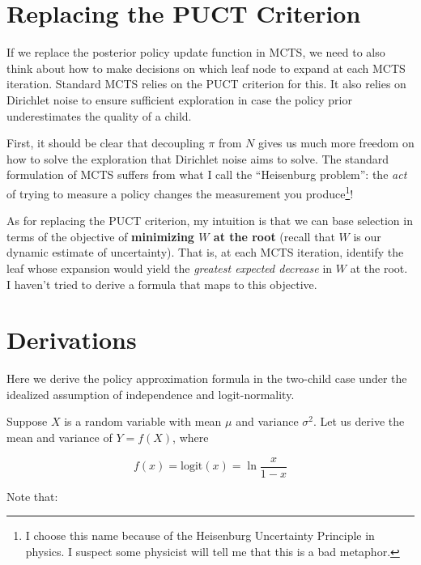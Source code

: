 \documentclass[tikz]{article}
\newcommand{\logit}{\mathrm{logit}}
\begin{document}
\section{Replacing the PUCT Criterion}

If we replace the posterior policy update function in MCTS, we need to also think about how to make decisions on which leaf node to expand
at each MCTS iteration. Standard MCTS relies on the PUCT criterion for this. It also relies on Dirichlet noise to ensure sufficient
exploration in case the policy prior underestimates the quality of a child. \newline

First, it should be clear that decoupling $\pi$ from $N$ gives us much more freedom on how to solve the exploration
that Dirichlet noise aims to solve. The standard formulation of MCTS suffers from what I call the ``Heisenburg problem'': the \textit{act}
of trying to measure a policy changes the measurement you produce\footnote{I choose this name because of the Heisenburg Uncertainty Principle in 
physics. I suspect some physicist will tell me that this is a bad metaphor.}! \newline

As for replacing the PUCT criterion, my intuition is that we can base selection in terms of the objective of \textbf{minimizing $W$ at the root}
(recall that $W$ is our dynamic estimate of uncertainty).
That is, at each MCTS iteration, identify the leaf whose expansion would yield the \textit{greatest expected decrease} in $W$ at the root.
I haven't tried to derive a formula that maps to this objective.

\newpage
\appendix
\renewcommand{\thesection}{Appendix \Alph{section}} %

\section{Derivations}
\label{appendix-derivations}

Here we derive the policy approximation formula in the two-child case under the idealized assumption of independence and logit-normality. \newline

Suppose $X$ is a random variable with mean $\mu$ and variance $\sigma^2$. Let us derive the mean and variance of $Y = f(X)$, where

$$f(x) = \logit(x) = \ln{\frac{x}{1-x}}$$

Note that:
\end{document}
